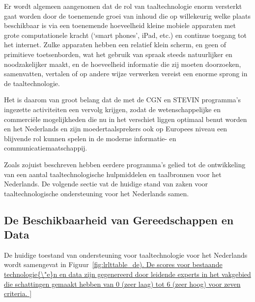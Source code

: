 \documentclass[]{../../metanetpaper}
\begin{document}
\begin{multicols}{2}
  Er wordt algemeen aangenomen dat de rol van taaltechnologie enorm versterkt gaat worden door de toenemende groei van inhoud die op willekeurig welke plaats beschikbaar is via een toenemende hoeveelheid kleine mobiele apparaten met grote computationele kracht (`smart phones', iPad, etc.) en continue toegang tot het internet. Zulke apparaten hebben een relatief klein scherm, en geen of primitieve toetsenborden, wat het gebruik van spraak steeds natuurlijker en noodzakelijker maakt, en de hoeveelheid informatie die zij moeten doorzoeken, samenvatten, vertalen of op andere wijze verwerken vereist een enorme sprong in de taaltechnologie.

  Het is daarom van groot belang dat de met de CGN en STEVIN programma's ingezette activiteiten een vervolg krijgen, zodat de wetenschappelijke en commerci{\"e}le mogelijkheden die nu in het verschiet liggen optimaal benut worden en het Nederlands en zijn moedertaalsprekers ook op Europees niveau een blijvende rol kunnen spelen in de moderne informatie- en communicatiemaatschappij.

Zoals zojuist beschreven hebben eerdere programma's gelied tot de ontwikkeling van een aantal taaltechnologische hulpmiddelen en taalbronnen voor het Nederlands. De volgende sectie vat de huidige stand van zaken voor taaltechnologische ondersteuning voor het Nederlands samen.

\subsection{De Beschikbaarheid van Gereedschappen en Data}

    De huidige toestand van ondersteuning voor taaltechnologie voor het Nederlands wordt samengevat in Figuur~\ref{fig:lrlttable_de). De scores voor bestaande technologie{\"e}n en data zijn gegenereerd door leidende experts in het vakgebied die schattingen gemaakt hebben van 0 (zeer laag) tot 6 (zeer hoog) voor zeven criteria.


}
\end{multicols}
\end{document}
